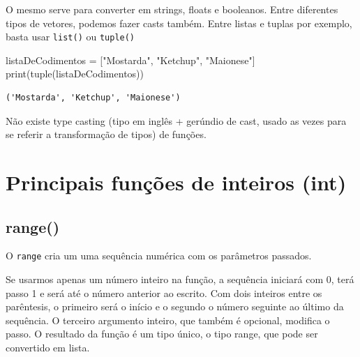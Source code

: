 \documentclass[
  letterpaper,
  DIV=11,
  numbers=noendperiod]{scrreprt}
\newenvironment{Shaded}{\begin{snugshade}}{\end{snugshade}}
\newcommand{\BuiltInTok}[1]{\textcolor[rgb]{0.00,0.23,0.31}{#1}}
\newcommand{\NormalTok}[1]{\textcolor[rgb]{0.00,0.23,0.31}{#1}}
\newcommand{\OperatorTok}[1]{\textcolor[rgb]{0.37,0.37,0.37}{#1}}
\newcommand{\StringTok}[1]{\textcolor[rgb]{0.13,0.47,0.30}{#1}}
\begin{document}
O mesmo serve para converter em strings, floats e booleanos. Entre
diferentes tipos de vetores, podemos fazer casts também. Entre listas e
tuplas por exemplo, basta usar \texttt{list()} ou \texttt{tuple()}

\begin{Shaded}
\begin{Highlighting}[]
\NormalTok{    listaDeCodimentos }\OperatorTok{=}\NormalTok{ [}\StringTok{"Mostarda"}\NormalTok{, }\StringTok{"Ketchup"}\NormalTok{, }\StringTok{"Maionese"}\NormalTok{]}
    \BuiltInTok{print}\NormalTok{(}\BuiltInTok{tuple}\NormalTok{(listaDeCodimentos))}
\end{Highlighting}
\end{Shaded}

\begin{tcolorbox}[enhanced jigsaw, breakable, leftrule=.75mm, left=2mm, opacityback=0, bottomrule=.15mm, toprule=.15mm, rightrule=.15mm, arc=.35mm, colback=white]

\begin{verbatim}
('Mostarda', 'Ketchup', 'Maionese')
\end{verbatim}

\end{tcolorbox}

Não existe type casting (tipo em inglês + gerúndio de cast, usado as
vezes para se referir a transformação de tipos) de funções.

\hypertarget{principais-funuxe7uxf5es-de-inteiros-int}{%
\section{Principais funções de inteiros
(int)}\label{principais-funuxe7uxf5es-de-inteiros-int}}

\hypertarget{range}{%
\subsection{range()}\label{range}}

O \texttt{range} cria um uma sequência numérica com os parâmetros
passados.

Se usarmos apenas um número inteiro na função, a sequência iniciará com
0, terá passo 1 e será até o número anterior ao escrito. Com dois
inteiros entre os parêntesis, o primeiro será o início e o segundo o
número seguinte ao último da sequência. O terceiro argumento inteiro,
que também é opcional, modifica o passo. O resultado da função é um tipo
único, o tipo range, que pode ser convertido em lista.
\end{document}
